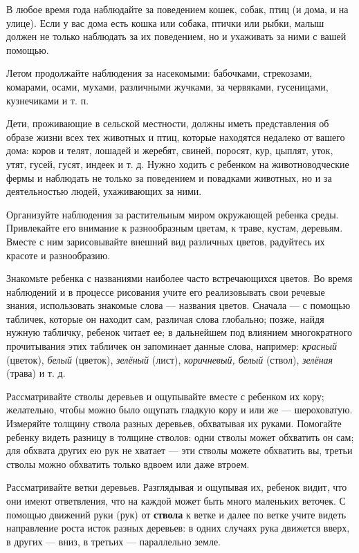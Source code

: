 \documentclass[a5paper]{book}
\renewcommand{\emph}[1]{\textit{#1}}
\begin{document}
В любое время года наблюдайте за поведением кошек, собак, птиц (и дома,
и на улице). Если у вас дома есть кошка или собака, птички или рыбки,
малыш должен не только наблюдать за их поведением, но и ухаживать за
ними с вашей помощью.

Летом продолжайте наблюдения за насекомыми: бабочками, стрекозами,
комарами, осами, мухами, различными жучками, за червяками, гусеницами,
кузнечиками и т. п.

Дети, проживающие в сельской местности, должны иметь представления об
образе жизни всех тех животных и птиц, которые находятся недалеко от
вашего дома: коров и телят, лошадей и жеребят, свиней, поросят, кур,
цыплят, уток, утят, гусей, гусят, индеек и т. д. Нужно ходить с ребенком
на животноводческие фермы и наблюдать не только за поведением и
повадками животных, но и за деятельностью людей, ухаживающих за ними.

Организуйте наблюдения за растительным миром окружающей ребенка среды.
Привлекайте его внимание к разнообразным цветам, к траве, кустам,
деревьям. Вместе с ним зарисовывайте внешний вид различных цветов,
радуйтесь их красоте и разнообразию.

Знакомьте ребенка с названиями наиболее часто встречающихся цветов. Во
время наблюдений и в процессе рисования учите его реализовывать свои
речевые знания, использовать знакомые слова --- названия цветов. Сначала
--- с помощью табличек, которые он находит сам, различая слова
глобально; позже, найдя нужную табличку, ребенок читает ее; в дальнейшем
под влиянием многократного прочитывания этих табличек он запоминает
данные слова, например: \emph{красный} (цветок), \emph{белый} (цветок),
\emph{зелёный} (лист), \emph{коричневый, белый} (ствол), \emph{зелёная}
(трава) и т. д.

Рассматривайте стволы деревьев и ощупывайте вместе с ребенком их кору;
желательно, чтобы можно было ощупать гладкую кору и или же ---
шероховатую. Измеряйте толщину ствола разных деревьев, обхватывая их
руками. Помогайте ребенку видеть разницу в толщине стволов: одни стволы
может обхватить он сам; для обхвата других ею рук не хватает --- эти
стволы можете обхватить вы, третьи стволы можно обхватить только вдвоем
или даже втроем.

Рассматривайте ветки деревьев. Разглядывая и ощупывая их, ребенок видит,
что они имеют ответвления, что на каждой может быть много маленьких
веточек. С помощью движений руки (рук) от \textbf{ствола} к ветке и
далее по ветке учите видеть направление роста исток разных деревьев: в
одних случаях рука движется вверх, в других --- вниз, в третьих ---
параллельно земле.
\end{document}
